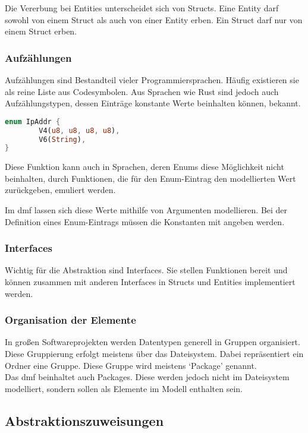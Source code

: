 \documentclass[./einleitung.tex]{subfiles}
\begin{document}
    Die Vererbung bei Entities unterscheidet sich von Structs.
    Eine Entity darf sowohl von einem Struct als auch von einer Entity erben.
    Ein Struct darf nur von einem Struct erben.

    \subsubsection{Aufzählungen}
    Aufzählungen sind Bestandteil vieler Programmiersprachen.
    Häufig existieren sie als reine Liste aus Codesymbolen.
    Aus Sprachen wie Rust sind jedoch auch Aufzählungstypen, dessen Einträge konstante Werte beinhalten können, bekannt.
    \begin{lstlisting}[language=Rust, caption=Ein Enum in Rust aus \citetitle{rustcookbook} \cite{rustcookbook}]
enum IpAddr {
        V4(u8, u8, u8, u8),
        V6(String),
}
    \end{lstlisting}

    Diese Funktion kann auch in Sprachen, deren Enums diese Möglichkeit nicht beinhalten, durch Funktionen, die für den Enum-Eintrag den modellierten Wert zurückgeben, emuliert werden.

    Im \acrshort{dmf} lassen sich diese Werte mithilfe von Argumenten modellieren.
    Bei der Definition eines Enum-Eintrags müssen die Konstanten mit angeben werden.

    \subsubsection{Interfaces}
    Wichtig für die Abstraktion sind Interfaces.
    Sie stellen Funktionen bereit und können zusammen mit anderen Interfaces in Structs und Entities implementiert werden.

    \subsubsection{Organisation der Elemente}
    In großen Softwareprojekten werden Datentypen generell in Gruppen organisiert.
    Diese Gruppierung erfolgt meistens über das Dateisystem.
    Dabei repräsentiert ein Ordner eine Gruppe.
    Diese Gruppe wird meistens `Package' genannt. \\
    Das \acrshort{dmf} beinhaltet auch Packages.
    Diese werden jedoch nicht im Dateisystem modelliert, sondern sollen als Elemente im Modell enthalten sein.

    \subsection{Abstraktionszuweisungen}\label{subsec:abstraktionszuweisungen}
\end{document}
